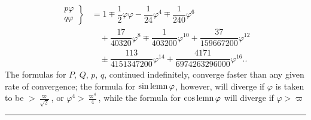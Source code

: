 \[
\begin{aligned}
\left.\begin{matrix}p\varphi\\q\varphi\end{matrix}\right\}
&=1\mp\dfrac12\varphi\varphi-\dfrac1{24}\varphi^4\mp\dfrac1{240}\varphi^6\\[6pt]&\quad{}+\dfrac{17}{40320}\varphi^8\mp\dfrac1{403200}\varphi^{10}+\dfrac{37}{159667200}\varphi^{12}\\[6pt]
&\quad\pm\dfrac{113}{4151347200}\varphi^{14}+\dfrac{4171}{6974263296000}\varphi^{16}\mathord{.}\mathord{.}
\end{aligned}
\]
The formulas for $P$, $Q$, $p$, $q$, continued indefinitely, converge faster than any given rate of convergence; the formula for $\operatorname{sin\,lemn}\varphi$, however, will diverge if $\varphi$ is taken to be $>\frac{\varpi}{\surd2}$, or $\varphi^4>\frac{\varpi^4}{4}$, while the formula for $\operatorname{cos\,lemn}\varphi$ will diverge if $\varphi>\varpi$
\par\begin{center}\rule{.22\linewidth}{.3pt}\end{center}
\clearpage
\endgroup
